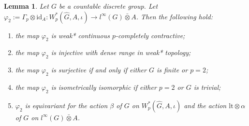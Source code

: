 \documentclass[reqno,11pt]{amsart}
\theoremstyle{plain}
\newtheorem{lem}[thm]{Lemma}
\theoremstyle{definition}
\theoremstyle{remark}
\begin{document}
\begin{lem}\label{2}
Let $G$ be a countable discrete group.
Let $\varphi_2:=\Gamma_p\otimes \mathrm{id}_A:W^*_p(\hat{G},A,\iota)\rightarrow l^\infty(G)\bar{\otimes} A$. Then the following hold:
\begin{enumerate}
\item[(i)] the map $\varphi_2$ is weak* continuous $p$-completely contractive;
\item[(ii)]  the map $\varphi_2$ is injective with dense range in weak* topology;
\item[(iii)] the map $\varphi_2$ is surjective if and only if either $G$ is finite or $p=2$;
\item[(iv)] the map $\varphi_2$ is isometrically isomorphic if either $p=2$ or $G$ is trivial;
\item[(v)] $\varphi_2$ is equivariant for the action $\beta$ of $G$ on $W^*_p(\hat{G},A,\iota)$ and the action $\mathrm{lt}\otimes\alpha$ of $G$ on $l^\infty(G)\bar{\otimes} A$.
\end{enumerate}
\end{lem}
\end{document}
